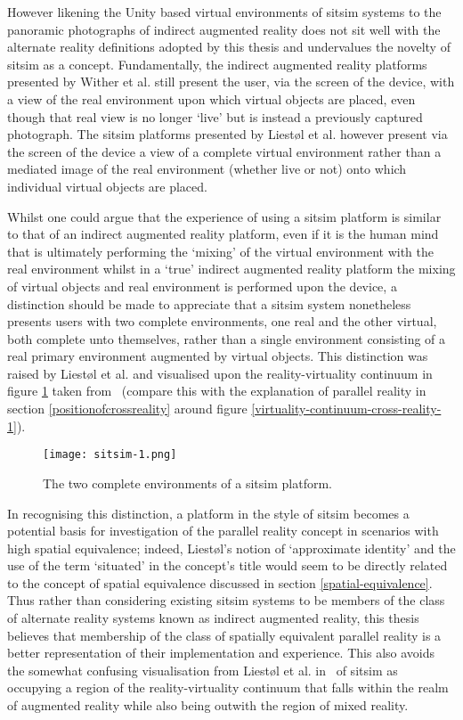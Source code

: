 However likening the Unity based virtual environments of sitsim systems to the panoramic photographs of indirect augmented reality does not sit well with the alternate reality definitions adopted by this thesis and undervalues the novelty of sitsim as a concept. Fundamentally, the indirect augmented reality platforms presented by Wither et al. still present the user, via the screen of the device, with a view of the real environment upon which virtual objects are placed, even though that real view is no longer `live' but is instead a previously captured photograph. The sitsim platforms presented by Liest\o l et al. however present via the screen of the device a view of a complete virtual environment rather than a mediated image of the real environment (whether live or not) onto which individual virtual objects are placed.

Whilst one could argue that the experience of using a sitsim platform is similar to that of an indirect augmented reality platform, even if it is the human mind that is ultimately performing the `mixing' of the virtual environment with the real environment whilst in a `true' indirect augmented reality platform the mixing of virtual objects and real environment is performed upon the device, a distinction should be made to appreciate that a sitsim system nonetheless presents users with two complete environments, one real and the other virtual, both complete unto themselves, rather than a single environment consisting of a real primary environment augmented by virtual objects. This distinction was raised by Liest\o l et al. and visualised upon the reality-virtuality continuum in figure \ref{sitsim-1.png} taken from~\cite{Liestøl2011} (compare this with the explanation of parallel reality in section \ref{positionofcrossreality} around figure \ref{virtuality-continuum-cross-reality-1}).

\begin{figure}[h]
\centering
  \texttt{[image: sitsim-1.png]}
  \caption{The two complete environments of a sitsim platform.}
  \label{sitsim-1.png}
\end{figure}

In recognising this distinction, a platform in the style of sitsim becomes a potential basis for investigation of the parallel reality concept in scenarios with high spatial equivalence; indeed, Liest\o l's notion of `approximate identity' and the use of the term `situated' in the concept's title would seem to be directly related to the concept of spatial equivalence discussed in section \ref{spatial-equivalence}. Thus rather than considering existing sitsim systems to be members of the class of alternate reality systems known as indirect augmented reality, this thesis believes that membership of the class of spatially equivalent parallel reality is a better representation of their implementation and experience. This also avoids the somewhat confusing visualisation from Liest\o l et al. in~\cite{Liestøl2011} of sitsim as occupying a region of the reality-virtuality continuum that falls within the realm of augmented reality while also being outwith the region of mixed reality.

